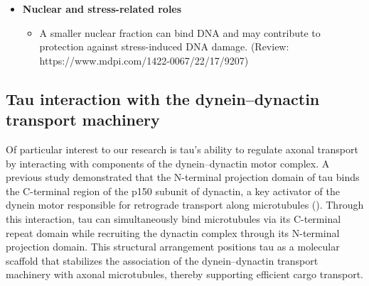 \documentclass[
  letterpaper,
  DIV=11,
  numbers=noendperiod]{scrreprt}
\providecommand{\tightlist}{%
  \setlength{\itemsep}{0pt}\setlength{\parskip}{0pt}}
\begin{document}
\begin{itemize}
  \begin{itemize}
  \tightlist
  \item
    Interfaces with chaperones, proteasome, and autophagy machinery to
    regulate tau turnover and quality control. (Review:
    https://www.mdpi.com/1422-0067/22/17/9207)
  \end{itemize}
\item
  \textbf{Nuclear and stress-related roles}

  \begin{itemize}
  \tightlist
  \item
    A smaller nuclear fraction can bind DNA and may contribute to
    protection against stress-induced DNA damage. (Review:
    https://www.mdpi.com/1422-0067/22/17/9207)
  \end{itemize}
\end{itemize}

\subsection{Tau interaction with the dynein--dynactin transport
machinery}\label{tau-interaction-with-the-dyneindynactin-transport-machinery}

Of particular interest to our research is tau's ability to regulate
axonal transport by interacting with components of the dynein--dynactin
motor complex. A previous study demonstrated that the N-terminal
projection domain of tau binds the C-terminal region of the p150 subunit
of dynactin, a key activator of the dynein motor responsible for
retrograde transport along microtubules
().
Through this interaction, tau can simultaneously bind microtubules via
its C-terminal repeat domain while recruiting the dynactin complex
through its N-terminal projection domain. This structural arrangement
positions tau as a molecular scaffold that stabilizes the association of
the dynein--dynactin transport machinery with axonal microtubules,
thereby supporting efficient cargo transport.
\end{document}

